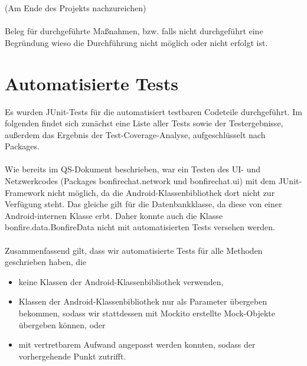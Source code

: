 
    (Am Ende des Projekts nachzureichen)\\\\
    Beleg für durchgeführte Maßnahmen, bzw. falls nicht durchgeführt eine Begründung wieso die Durchführung nicht möglich oder nicht erfolgt ist. \\




\section{Automatisierte Tests}

Es wurden JUnit-Tests für die automatisiert testbaren Codeteile durchgeführt.
Im folgenden findet sich zunächst eine Liste aller Tests sowie der Testergebnisse,
außerdem das Ergebnis der Test-Coverage-Analyse, aufgeschlüsselt nach Packages.
\\\\
Wie bereits im QS-Dokument beschrieben, war ein Testen des UI- und Netzwerkcodes
(Packages bonfirechat.network und bonfirechat.ui)
mit dem JUnit-Framework nicht möglich, da die Android-Klassenbibliothek dort nicht
zur Verfügung steht. Das gleiche gilt für die Datenbankklasse, da diese von einer
Android-internen Klasse erbt. Daher konnte auch die Klasse bonfire.data.BonfireData
nicht mit automatisierten Tests versehen werden.
\\\\
Zusammenfassend gilt, dass wir automatisierte Tests für alle Methoden geschrieben haben,
die
\begin{itemize}
\item keine Klassen der Android-Klassenbibliothek verwenden,
\item Klassen der Android-Klassenbibliothek nur als Parameter übergeben bekommen,
sodass wir stattdessen mit Mockito erstellte Mock-Objekte übergeben können, oder
\item mit vertretbarem Aufwand angepasst werden konnten, sodass der vorhergehende Punkt zutrifft.
\end{itemize}







